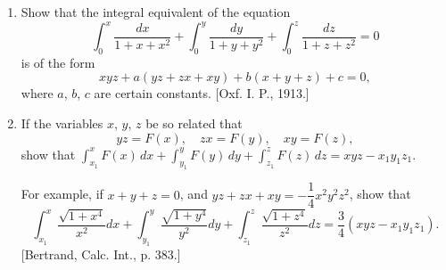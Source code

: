 \documentclass[11pt, a4paper]{article}
\newcommand{\source}[1]{\hfill\textnormal{[#1]}}
\begin{document}
\begin{enumerate}[leftmargin=2em]
Let $C_p$ be the specific heat of the liquid at constant pressure, which, as liquids are practically incompressible, is so nearly equal to $C$ that no appreciable error results from regarding them as identical.

Then Regnault has shown experimentally that the sum of the free and latent heat, viz.\ $L+\displaystyle\int_{273}^\theta C_p\, d\theta$, is not a constant as had been supposed by Watt in his earlier experiments, but is a function of the temperature $\theta$, viz.\ putting $\theta = 273+\theta'$ and $J$ being the number of ergs in one calorie (41,539,739.8 ergs or about 3 foot-lbs.), he obtained the equations
\begin{enumerate}[label=(\arabic*)]
\item $L+\displaystyle\int_{273}^\theta C_p\, d\theta = J(\alpha+\beta\theta'+\gamma\theta'^2)$,
\item $C_p = J(\alpha'+\beta'\theta'+\gamma'\theta'^2)$,
\end{enumerate}
experimentally, determining the constants $\alpha$, $\beta$, $\gamma$; $\alpha'$, $\beta'$, $\gamma'$ for several vapours.

Using these data, prove that
\begin{enumerate}[label=(\arabic*)]
\item $\dfrac{dL}{d\theta}+C_p = J(\beta+2\gamma\theta')$,
\item $L=J\left[\alpha+(\beta-\alpha')\theta'+(2\gamma-\beta')\dfrac{\theta'^2}{2}-\gamma'\dfrac{\theta'^3}{3}\right]$,
\item $c'\equiv\dfrac{C'}{J}=\beta+2\gamma\theta'-\dfrac{\alpha+(\beta-\alpha')\theta'+(2\gamma-\beta')\frac{\theta'^2}{2}-\gamma'\frac{\theta'^3}{3}}{273+\theta'}$.
\end{enumerate}

\item Show that the integral equivalent of the equation
\[
\int_0^x \dfrac{dx}{1+x+x^2}+\int_0^y \dfrac{dy}{1+y+y^2}+\int_0^z \dfrac{dz}{1+z+z^2}=0
\]
is of the form
\[
xyz+a(yz+zx+xy)+b(x+y+z)+c=0,
\]
where $a$, $b$, $c$ are certain constants. \source{Oxf. I. P., 1913.}

\item If the variables $x$, $y$, $z$ be so related that
\[
yz=F(x), \quad zx=F(y), \quad xy=F(z),
\]
show that $\displaystyle\int_{x_1}^x F(x)\, dx+\int_{y_1}^y F(y)\, dy+\int_{z_1}^z F(z)\, dz = xyz-x_1y_1z_1$.

For example, if $x+y+z=0$,
and $yz+zx+xy=-\dfrac14 x^2y^2z^2$,
show that
\[
\int_{x_1}^x \dfrac{\sqrt{1+x^4}}{x^2}dx+\int_{y_1}^y \dfrac{\sqrt{1+y^4}}{y^2}dy+\int_{z_1}^z \dfrac{\sqrt{1+z^4}}{z^2}dz = \dfrac34(xyz-x_1y_1z_1).
\]
\source{Bertrand, Calc. Int., p. 383.}


\end{enumerate}
\end{document}
